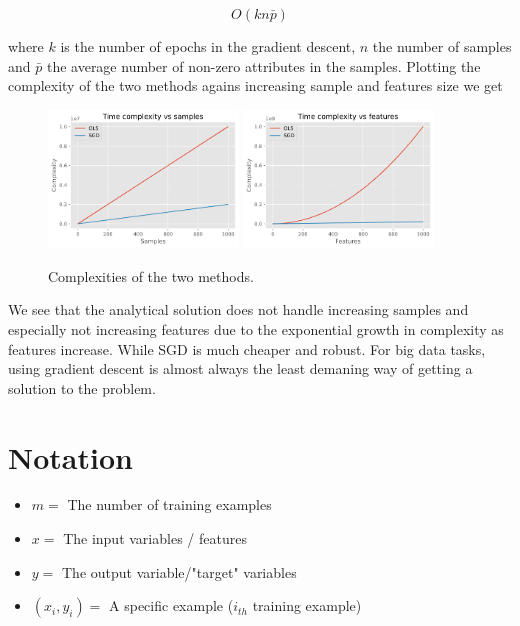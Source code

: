 \begin{equation*}
    O(kn\bar{p})
\end{equation*}

where $k$ is the number of epochs in the gradient descent, $n$ the number of
samples and $\bar{p}$ the average number of non-zero attributes in the samples.
Plotting the complexity of the two methods agains increasing sample and features
size we get

\begin{figure}[H]
\label{fig:complexity}
\centering
\includegraphics[width=0.45\textwidth]{figures/complexity-samples.png}
\includegraphics[width=0.45\textwidth]{figures/complexity-features.png}
\caption{Complexities of the two methods.}
\end{figure}

We see that the analytical solution does not handle increasing samples and
especially not increasing features due to the exponential growth in complexity
as features increase. While SGD is much cheaper and robust. For big data 
tasks, using gradient descent is almost always the least demaning way of getting
a solution to the problem.

\section{Notation}
\begin{itemize}
    \item $m = $ The number of training examples
    \item $x = $ The input variables / features
    \item $y = $ The output variable/"target" variables
    \item $(x_i, y_i) = $ A specific example ($i_{th}$ training example)
\end{itemize}

